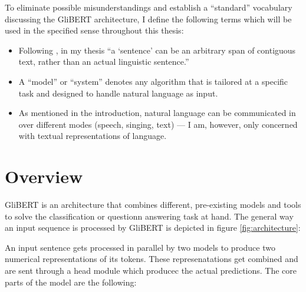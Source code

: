 
\label{chap:4_architecture}

To eliminate possible misunderstandings and establish a ``standard'' vocabulary discussing the GliBERT
architecture, I define the following terms which will be used in the specified sense throughout
this thesis:

\begin{itemize}
  \item Following \cite{devlin2018bert}, in my thesis ``a `sentence' can be an arbitrary span of contiguous text, rather
    than an actual linguistic sentence.''
  \item A ``model'' or ``system'' denotes any algorithm that is tailored at a specific task and designed
    to handle natural language as input.
  \item As mentioned in the introduction, natural language can be communicated in over different modes (speech, singing, text)
    --- I am, however, only concerned with textual representations of language.
\end{itemize}



\section{Overview}

GliBERT is an architecture that combines different, pre-existing models and
tools to solve the classification or questionn answering task at hand. The
general way an input sequence is processed by GliBERT is depicted in figure
\ref{fig:architecture}:



An input sentence gets processed in parallel by two models to produce two numerical
representations of its tokens. These represenatations get combined and are sent
through a head module which producec the actual predictions. The core parts of the
model are the following:

